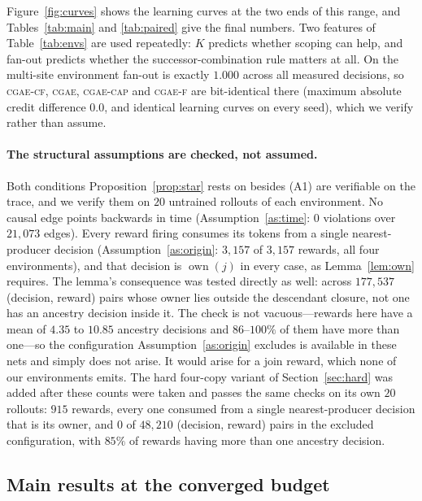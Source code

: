 \documentclass[review,authoryear,3p,times]{elsarticle}
\newcommand{\cgae}{\textsc{cgae}}              %
\newcommand{\cflow}{\textsc{cgae-cf}}          %
\newcommand{\cflowraw}{\textsc{cgae-f}}        %
\newcommand{\ccap}{\textsc{cgae-cap}}          %
\newcommand{\own}{\operatorname{own}}
\begin{document}
Figure~\ref{fig:curves} shows the learning curves at the two ends of this
range, and Tables~\ref{tab:main} and \ref{tab:paired} give the final numbers.
Two features of Table~\ref{tab:envs} are used repeatedly: $K$ predicts whether
scoping can help, and fan-out predicts whether the successor-combination rule
matters at all. On the multi-site environment fan-out is exactly $1.000$ across
all measured decisions, so \cflow, \cgae, \ccap{} and \cflowraw{} are
bit-identical there (maximum absolute credit difference $0.0$, and identical
learning curves on every seed), which we verify rather than assume.

\paragraph{The structural assumptions are checked, not assumed.} Both
conditions Proposition~\ref{prop:star} rests on besides (A1) are verifiable on
the trace, and we verify them on $20$ untrained rollouts of each environment.
No causal edge points backwards in time (Assumption~\ref{as:time}: $0$
violations over $21{,}073$ edges). Every reward firing consumes its tokens from
a single nearest-producer decision (Assumption~\ref{as:origin}: $3{,}157$ of
$3{,}157$ rewards, all four environments), and that decision is $\own(j)$ in
every case, as Lemma~\ref{lem:own} requires. The lemma's consequence was tested
directly as well: across $177{,}537$ (decision, reward) pairs whose owner lies
outside the descendant closure, not one has an ancestry decision inside it. The
check is not vacuous---rewards here have a mean of $4.35$ to $10.85$ ancestry
decisions and $86$--$100\%$ of them have more than one---so the configuration
Assumption~\ref{as:origin} excludes is available in these nets and simply does
not arise. It would arise for a join reward, which none of our environments
emits. The hard four-copy variant of Section~\ref{sec:hard} was added after
these counts were taken and passes the same checks on its own $20$ rollouts:
$915$ rewards, every one consumed from a single nearest-producer decision that
is its owner, and $0$ of $48{,}210$ (decision, reward) pairs in the excluded
configuration, with $85\%$ of rewards having more than one ancestry decision.

\subsection{Main results at the converged budget}
\end{document}
